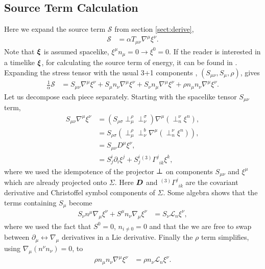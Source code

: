 \subsection{Source Term Calculation} \label{sect:source}
Here we expand the source term $\mathcal{S}$ from section \ref{sect:derive},
\begin{align}
\mathcal{S} &= \alpha T_{\mu\nu} \nabla^\mu \xi^\nu.
\end{align}
Note that $\boldsymbol{\xi}$ is assumed spacelike, $\xi^\mu n_\mu = 0\rightarrow \xi^0=0$. If the reader is interested in a timelike $\boldsymbol{\xi}$, for calculating the source term of energy, it can be found in \cite{Clough_2021}. Expanding the stress tensor with the usual 3+1 components \cite{gourgoulhon20073+}, \cite{alcubierre2008introduction} $(S_{\mu\nu}, S_{\mu}, \rho)$, gives
\begin{align}
\frac{1}{\alpha}\mathcal{S} &= S_{\mu\nu}\nabla^\mu \xi^\nu + S_\mu n_\nu \nabla^\mu \xi^\nu + S_\nu n_\mu \nabla^\mu \xi^\nu + \rho n_\mu n_\nu\nabla^\mu \xi^\nu.
\end{align}
Let us decompose each piece separately. Starting with the spacelike tensor $S_{\mu\nu}$ term,
\begin{align}
S_{\mu\nu}\nabla^\mu \xi^\nu &= (S_{\rho \sigma}\perp^\rho _\mu \perp^\sigma_\nu )\nabla^\mu ( \perp^\nu_n \xi^n ),  \\
&= S_{\rho \sigma}(\perp^\rho _\mu \perp^b_\nu \nabla^\mu ( \perp^\nu_n \xi^n )),  \\
&= S_{\mu\nu} D^\mu \xi^\nu, \\
&= S^i_{j}\partial_i \xi^j + S^i_{j} {}^{(3)}\Gamma^j_{\,\,\,i k} \xi^k, 
\label{eq:S1}
\end{align}
where we used the idempotence of the projector $\boldsymbol{\perp}$ on components $S_{\mu\nu}$ and $\xi^\mu$ which are already projected onto $\Sigma$. Here $\boldsymbol{D}$ and ${}^{(3)}\Gamma^j_{\,\,\,i k}$ are the covariant derivative and Christoffel symbol components of $\Sigma$. Some algebra shows that the terms containing $S_\mu$ become
\begin{align} 
\label{eq:S2}S_\nu n^\mu \nabla_\mu \xi^\nu + S^\mu n_\nu \nabla_\mu \xi^\nu  &= S_\nu \mathcal{L}_n \xi^\nu, 
\end{align}
where we used the fact that $S^0 = 0$, $n_{i\neq0}=0$ and that the we are free to swap between $\partial_\mu \leftrightarrow \nabla_\mu$ derivatives in a Lie derivative. Finally the $\rho$ term simplifies, using $\nabla_\mu (n^\nu n_\nu) = 0$, to
\begin{align} \label{eq:S3}
\rho n_\mu n_\nu\nabla^\mu \xi^\nu &= \rho n_\nu \mathcal{L}_n \xi^\nu.
\end{align}
